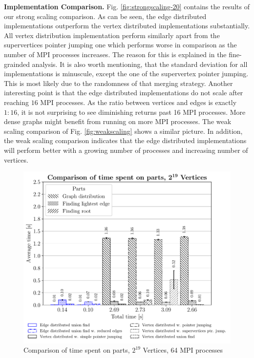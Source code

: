 \documentclass[letterpaper]{article}
\newcommand{\mypar}[1]{{\bf #1.}}
\begin{document}
\mypar{Implementation Comparison}
Fig. \ref{fig:strongscaling-20} contains the results of our strong scaling comparison. As can be seen, the edge
distributed implementations outperform the vertex distributed implementations substantially. All vertex distribution
implementation perform similarly apart from the supervertices pointer jumping one which performs worse in comparison as
the number of MPI processes increases. The reason for this is explained in the fine-grainded analysis. It is also worth
mentioning, that the standard deviation for all implementations is minuscule, except the one of the supervertex pointer
jumping. This is most likely due to the randomness of that merging strategy. Another interesting point is that the edge
distributed implementations do not scale after reaching $16$ MPI processes. As the ratio between vertices and edges is
exactly $1:16$, it is not surprising to see diminishing returns past 16 MPI processes. More dense graphs might benefit
from running on more MPI processes.
The weak scaling comparison of Fig. \ref{fig:weakscaling} shows a similar picture. In addition, the weak scaling
comparison indicates that the edge distributed implementations will perform better with a growing number of processes
and increasing number of vertices.

\begin{figure}
  \includegraphics[width=\columnwidth]{../benchmark-results/plots/comparison.pdf}
  \caption{Comparison of time spent on parts, $2^{19}$ Vertices, 64 MPI processes}
  \label{fig:comparison}
\end{figure}
\end{document}

